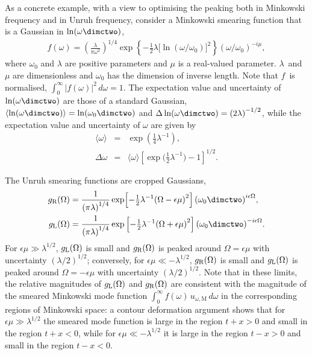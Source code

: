 As a concrete example, with a view to optimising the peaking both in
Minkowski frequency and in
Unruh frequency, 
consider a Minkowski smearing function that is
a Gaussian in  $\ln(\omega\dimctwo)$, 
\begin{align}
\label{eq:gaussian-in-log}
f(\omega) = 
\left(\frac{\lambda}{\pi\omega^2}\right)^{\!\!1/4}
\exp\left\{- \tfrac12 \lambda
{\bigl[\ln(\omega/\omega_0)\bigr]}^2
\right\}
{(\omega/\omega_0)}^{-i\mu},
\end{align}
where $\omega_0$ and $\lambda$ are positive parameters and $\mu$ is a real-valued parameter. 
$\lambda$~and $\mu$ are dimensionless and $\omega_0$ has the dimension of inverse length. 
Note that $f$~is normalised, $\int_{0}^{\infty} {|f(\omega)|}^2 \, d\omega =1$. 
The expectation value and uncertainty of $\ln(\omega\dimctwo)$ are those of 
a standard Gaussian, $\langle \ln(\omega\dimctwo) \rangle = \ln(\omega_0\dimctwo)$ 
and $\Delta \ln(\omega\dimctwo) = {(2\lambda)}^{-1/2}$, 
while the expectation value and uncertainty of $\omega$ are given by 
\begin{eqnarray}
\langle \omega \rangle &=& \exp\left(\tfrac14\lambda^{-1}\right),\nonumber \\
\Delta\omega &=& \langle \omega \rangle {\left[\exp\bigl(\tfrac12\lambda^{-1}\bigr) -1 \right]}^{1/2}. 
\end{eqnarray}

The Unruh smearing functions are cropped Gaussians, 
\begin{align}
\label{eq:gs-gauss}
g_\text{\text{R}}(\Omega) &= \frac{1}{{(\pi\lambda)}^{1/4}}\exp\!\left[- \tfrac12 \lambda^{-1}{(\Omega - \epsilon\mu)}^2 \right] 
{(\omega_0\dimctwo)}^{i\epsilon\Omega},\nonumber \\
g_\text{\text{L}}(\Omega) &= \frac{1}{{(\pi\lambda)}^{1/4}}\exp\left[- \tfrac12 \lambda^{-1}{(\Omega + \epsilon\mu)}^2\right] 
{(\omega_0\dimctwo)}^{-i\epsilon\Omega}.
\end{align}
For $\epsilon\mu \gg \lambda^{1/2}$, $g_\text{\text{L}}(\Omega)$ is small and $g_\text{\text{R}}(\Omega)$ 
is peaked around $\Omega = \epsilon\mu$ with uncertainty ${(\lambda/2)}^{1/2}$; 
conversely, for $\epsilon\mu \ll -\lambda^{1/2}$, $g_\text{\text{R}}(\Omega)$ is small 
and $g_\text{\text{L}}(\Omega)$ is peaked around $\Omega = - \epsilon\mu$ with 
uncertainty ${(\lambda/2)}^{1/2}$. Note that in these limits, 
the relative magnitudes of $g_\text{\text{L}}(\Omega)$ and $g_\text{\text{R}}(\Omega)$ are 
consistent with the magnitude of the smeared Minkowski mode 
function $\int_{0}^{\infty}f(\omega) \, u_{\omega,\text{M}} \, d\omega$ 
in the corresponding regions of Minkowski space: 
a contour deformation argument shows that for $\epsilon\mu \gg \lambda^{1/2}$ 
the smeared mode function 
is large in the region $t+x>0$ and small in the region $t+x<0$, 
while for $\epsilon\mu \ll -\lambda^{1/2}$ it is large in the 
region $t-x>0$ and small in the region $t-x<0$. 

